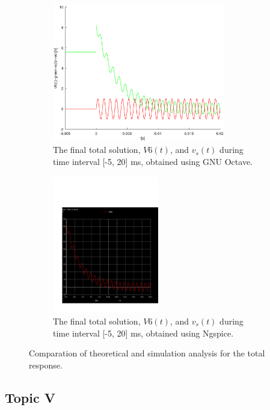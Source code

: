 \begin{figure}[H]

\begin{subfigure}{0.5\textwidth}
\includegraphics[width=0.9\linewidth, height=6cm]{total.eps} 
\caption{The final total solution, $V6(t)$,  and $v_s(t)$ during time interval [-5, 20] ms, obtained using GNU Octave.}
\label{fig:theo_fifth}
\end{subfigure}
\begin{subfigure}{0.5\textwidth}
\includegraphics[width=0.9\linewidth, height=6cm]{trans2.pdf}
\caption{The final total solution, $V6(t)$,  and $v_s(t)$ during time interval [-5, 20] ms, obtained using Ngspice.}
\label{fig:total}
\end{subfigure}

\caption{Comparation of theoretical and simulation analysis for the total response.}
\label{fig:compar_2}
\end{figure}


\subsection{Topic V}
\label{subsec:fifth_topic_error}

